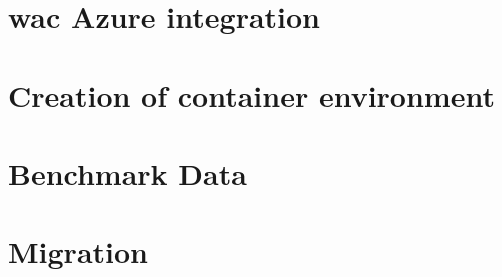 \documentclass{bachproef-tin}
\begin{document}
\chapter{\acrlong{wac} Azure integration}

\chapter{Creation of container environment}

\chapter{Benchmark Data}

\chapter{Migration}

%
\printbibliography[heading=bibintoc]
\end{document}
